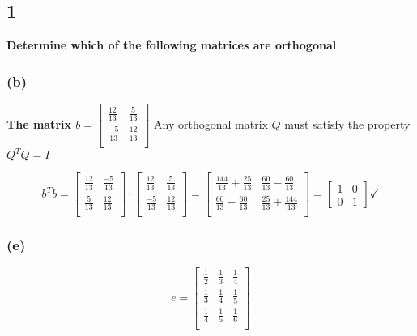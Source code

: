 \documentclass[10pt,letterpaper]{article}
\begin{document}
	\subsection*{1} \textbf{Determine which of the following matrices are orthogonal}
	\subsubsection*{(b)} \textbf{The matrix $b = \begin{bmatrix}
		\frac{12}{13} & \frac{5}{13} \\ 
		\frac{-5}{13} & \frac{12}{13} \\ 
		\end{bmatrix}$}
	Any orthogonal matrix $Q$ must satisfy the property $Q^TQ = I$
	
	$$
	b^Tb = \begin{bmatrix}
	\frac{12}{13} & \frac{-5}{13} \\ 
	\frac{5}{13} & \frac{12}{13} \\ 
	\end{bmatrix} \cdot \begin{bmatrix}
	\frac{12}{13} & \frac{5}{13} \\ 
	\frac{-5}{13} & \frac{12}{13} \\ 
	\end{bmatrix} = \begin{bmatrix}
	\frac{144}{13} + \frac{25}{13} & \frac{60}{13} - \frac{60}{13} \\
	\frac{60}{13} - \frac{60}{13} & \frac{25}{13} + \frac{144}{13} \\
	\end{bmatrix} = \begin{bmatrix}
	1 & 0 \\ 0 & 1
	\end{bmatrix} \checkmark
	$$ 
	\subsubsection*{(e)}
	$$e = \begin{bmatrix}
	\frac{1}{2} & \frac{1}{3} & \frac{1}{4} \\ 
	\frac{1}{3} & \frac{1}{4} & \frac{1}{5} \\ 
	\frac{1}{4} & \frac{1}{5} & \frac{1}{6} \\ 
	\end{bmatrix}
	$$
	
\end{document}

